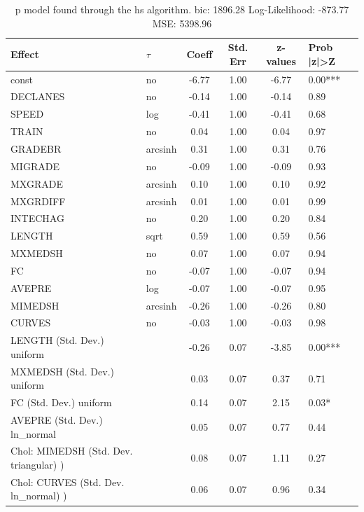 \begin{table}
	\caption{p model found through the hs algorithm. bic: 1896.28 Log-Likelihood: -873.77 MSE: 5398.96}
	\begin{center}
		\begin{tabular}{|l|l|c|c|c|l|}
			\hline
			Effect & $\tau$ & Coeff & Std. Err & z-values & Prob |z|>Z \\
			\hline
			const & no & -6.77 & 1.00 & -6.77 & 0.00*** \\
			\hline
			DECLANES & no & -0.14 & 1.00 & -0.14 & 0.89 \\
			\hline
			SPEED & log & -0.41 & 1.00 & -0.41 & 0.68 \\
			\hline
			TRAIN & no & 0.04 & 1.00 & 0.04 & 0.97 \\
			\hline
			GRADEBR & arcsinh & 0.31 & 1.00 & 0.31 & 0.76 \\
			\hline
			MIGRADE & no & -0.09 & 1.00 & -0.09 & 0.93 \\
			\hline
			MXGRADE & arcsinh & 0.10 & 1.00 & 0.10 & 0.92 \\
			\hline
			MXGRDIFF & arcsinh & 0.01 & 1.00 & 0.01 & 0.99 \\
			\hline
			INTECHAG & no & 0.20 & 1.00 & 0.20 & 0.84 \\
			\hline
			LENGTH & sqrt & 0.59 & 1.00 & 0.59 & 0.56 \\
			\hline
			MXMEDSH & no & 0.07 & 1.00 & 0.07 & 0.94 \\
			\hline
			FC & no & -0.07 & 1.00 & -0.07 & 0.94 \\
			\hline
			AVEPRE & log & -0.07 & 1.00 & -0.07 & 0.95 \\
			\hline
			MIMEDSH & arcsinh & -0.26 & 1.00 & -0.26 & 0.80 \\
			\hline
			CURVES & no & -0.03 & 1.00 & -0.03 & 0.98 \\
			\hline
			LENGTH (Std. Dev.) uniform &  & -0.26 & 0.07 & -3.85 & 0.00*** \\
			\hline
			MXMEDSH (Std. Dev.) uniform &  & 0.03 & 0.07 & 0.37 & 0.71 \\
			\hline
			FC (Std. Dev.) uniform &  & 0.14 & 0.07 & 2.15 & 0.03* \\
			\hline
			AVEPRE (Std. Dev.) ln_normal &  & 0.05 & 0.07 & 0.77 & 0.44 \\
			\hline
			 Chol: MIMEDSH (Std. Dev. triangular) ) &  & 0.08 & 0.07 & 1.11 & 0.27 \\
			\hline
			 Chol: CURVES (Std. Dev. ln_normal) ) &  & 0.06 & 0.07 & 0.96 & 0.34 \\
			\hline

\end{tabular}
\end{center}
\end{table}
